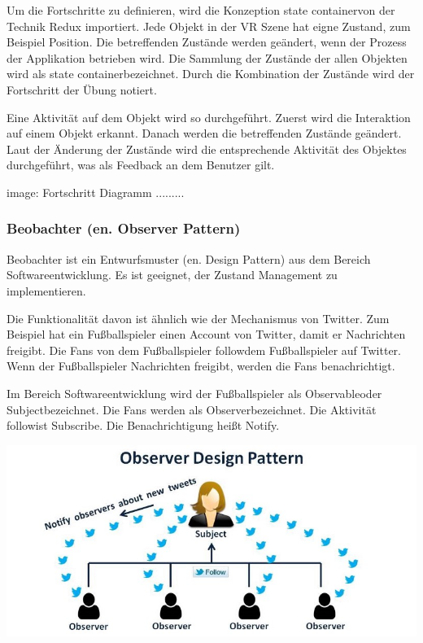  Um die Fortschritte zu definieren, wird die Konzeption \glqq state container\grqq von der Technik Redux importiert. Jede Objekt in der VR Szene hat eigne Zustand, zum Beispiel Position. Die betreffenden Zustände werden geändert, wenn der Prozess der Applikation betrieben wird. Die Sammlung der Zustände der allen Objekten wird als \glqq state container\grqq bezeichnet. Durch die Kombination der Zustände wird der Fortschritt der Übung notiert.
 
 Eine Aktivität auf dem Objekt wird so durchgeführt. Zuerst wird die Interaktion auf einem Objekt erkannt. Danach werden die betreffenden Zustände geändert. Laut der Änderung der Zustände wird die entsprechende Aktivität des Objektes durchgeführt, was als Feedback an dem Benutzer gilt.
 
 image: Fortschritt Diagramm .........
 
  \subsubsection{Beobachter (en. Observer Pattern)}
  Beobachter ist ein Entwurfsmuster (en. Design Pattern) aus dem Bereich Softwareentwicklung. Es ist geeignet, der Zustand Management zu implementieren.
  
  Die Funktionalität davon ist ähnlich wie der Mechanismus von Twitter. Zum Beispiel hat ein Fußballspieler einen Account von Twitter, damit er Nachrichten freigibt. Die Fans von dem Fußballspieler \glqq follow\grqq dem Fußballspieler auf Twitter. Wenn der Fußballspieler Nachrichten freigibt, werden die Fans benachrichtigt.
  
  Im Bereich Softwareentwicklung wird der Fußballspieler als \glqq Observable\grqq oder \glqq Subject\grqq bezeichnet. Die Fans werden als \glqq Observer\grqq bezeichnet. Die Aktivität \glqq follow\grqq ist \glqq Subscribe\grqq. Die Benachrichtigung heißt \glqq Notify\grqq.
  
  \includegraphics[width=\textwidth]{images/observerPattern.jpeg}
  

